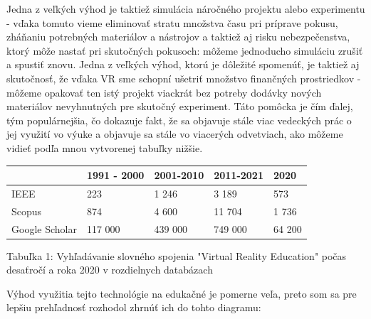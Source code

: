\documentclass[10pt,twoside,slovak,a4paper]{article}
\begin{document}
Jedna z veľkých výhod je taktiež simulácia náročného projektu alebo experimentu  - vďaka tomuto vieme eliminovať stratu množstva času pri príprave pokusu, zháňaniu potrebných materiálov a nástrojov a taktiež aj risku nebezpečenstva, ktorý môže nastať pri skutočných pokusoch: môžeme jednoducho simuláciu zrušiť a spustiť znovu. Jedna z veľkých výhod, ktorú je dôležité spomenúť, je taktiež aj skutočnosť, že vďaka VR sme schopní ušetriť množstvo finančných prostriedkov - môžeme opakovať ten istý projekt viackrát bez potreby dodávky nových materiálov nevyhnutných pre skutočný experiment. Táto pomôcka je čím ďalej, tým populárnejšia, čo dokazuje fakt, že sa objavuje stále viac vedeckých prác o jej využití vo výuke \cite{vyucovanie} a objavuje sa stále vo viacerých odvetviach, ako môžeme vidieť podľa mnou vytvorenej tabuľky nižšie.

\begin{center}
    \begin{tabular}{| l | l | l | l | l |}
    \hline
     & 1991 - 2000 & 2001-2010 & 2011-2021 & 2020 \\ \hline
    IEEE & 223 & 1 246 & 3 189 & 573\\ \hline
    Scopus & 874 & 4 600 & 11 704 & 1 736\\ \hline
    Google Scholar & 117 000 & 439 000 & 749 000 & 64 200 \\
    \hline
    \end{tabular}
\end{center}

Tabuľka 1: Vyhľadávanie slovného spojenia "Virtual Reality Education"  počas desaťročí a roka 2020 v rozdielnych databázach

Výhod využitia tejto technológie na edukačné je pomerne veľa, preto som sa pre lepšiu prehľadnosť rozhodol zhrnúť ich do tohto diagramu:
\end{document}
